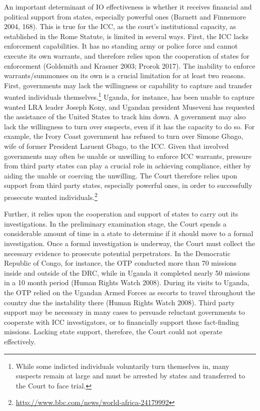 An important determinant of IO effectiveness is whether it receives financial and political support from states, especially powerful ones (Barnett and Finnemore 2004, 168).  This is true for the ICC, as the court's institutional capacity, as established in the Rome Statute, is limited in several ways.  First, the ICC lacks enforcement capabilities. It has no standing army or police force and cannot execute its own warrants, and therefore relies upon the cooperation of states for enforcement (Goldsmith and Krasner 2003; Prorok 2017). The inability to enforce warrants/summonses on its own is a crucial limitation for at least two reasons. First, governments may lack the willingness or capability to capture and transfer wanted individuals themselves.\footnote{While some indicted individuals voluntarily turn themselves in, many suspects remain at large and must be arrested by states and transferred to the Court to face trial.}  Uganda, for instance, has been unable to capture wanted LRA leader Joseph Kony, and Ugandan president Museveni has requested the assistance of the United States to track him down. A government may also lack the willingness to turn over suspects, even if it has the capacity to do so. For example, the Ivory Coast government has refused to turn over Simone Gbago, wife of former President Laruent Gbago, to the ICC. Given that involved governments may often be unable or unwilling to enforce ICC warrants, pressure from third party states can play a crucial role in achieving compliance, either by aiding the unable or coercing the unwilling. The Court therefore relies upon support from third party states, especially powerful ones, in order to successfully prosecute wanted individuals.\footnote{\url{http://www.bbc.com/news/world-africa-24179992}}  

Further, it relies upon the cooperation and support of states to carry out its investigations. In the preliminary examination stage, the Court spends a considerable amount of time in a state to determine if it should move to a formal investigation. Once a formal investigation is underway, the Court must collect the necessary evidence to prosecute potential perpetrators. In the Democratic Republic of Congo, for instance, the OTP conducted more than 70 missions inside and outside of the DRC, while in Uganda it completed nearly 50 missions in a 10 month period (Human Rights Watch 2008). During its visits to Uganda, the OTP relied on the Ugandan Armed Forces as escorts to travel throughout the country due the instability there (Human Rights Watch 2008). Third party support may be necessary in many cases to persuade reluctant governments to cooperate with ICC investigators, or to financially support these fact-finding missions. Lacking state support, therefore, the Court could not operate effectively. 

